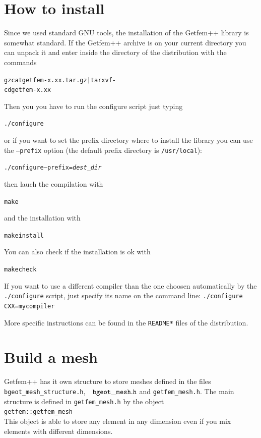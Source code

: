 \documentclass[11pt,a4paper]{article}
\begin{document}
\newpage
\tableofcontents
\newpage

\section{How to install}

Since we used standard GNU tools, the installation of the {\sc Getfem++} library is somewhat standard. If the {\sc Getfem++} archive is on your current directory you can unpack it and enter inside the directory of the distribution  with the commands
\begin{alltt}
  gzcat getfem-x.xx.tar.gz | tar xvf -
  cd  getfem-x.xx
\end{alltt}
Then you you have to run the configure script just typing
\begin{alltt}
  ./configure
\end{alltt}
or if you want to set the prefix directory where to install the library you can use the {\tt --prefix} option (the default prefix directory is {\tt /usr/local}):
\begin{alltt}
  ./configure --prefix=\textit{dest_dir}
\end{alltt}
then lauch the compilation with
\begin{alltt}
  make
\end{alltt}
and the installation with
\begin{alltt}
  make install
\end{alltt}
You can also check if the installation is ok with
\begin{alltt}
  make check
\end{alltt}

If you want to use a different compiler than the one choosen
automatically by the \texttt{./configure} script, just specify its
name on the command line: \texttt{./configure CXX=mycompiler}

More specific instructions can be found in the \texttt{README*} files of
the distribution.

\section{Build a mesh}
{\sc Getfem++} has it own structure to store meshes defined in the files {\tt bgeot\_mesh\_structure.h}, $\;$ ${\tt bgeot\_mesh.h}$ and {\tt getfem\_mesh.h}. The main structure is defined in {\tt getfem\_mesh.h} by the object\\[0.5cm]
{\tt getfem::getfem\_mesh }\\[0.5cm]
This object is able to store any element in any dimension even if you mix elements with different dimensions.\\[0.5cm]
\end{document}
